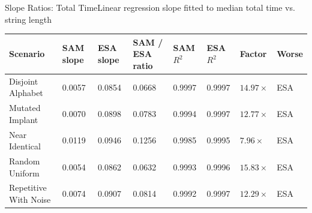 \begin{benchmarktable}{Slope Ratios: Total Time}{Linear regression slope fitted to median total time vs. string length }
\begin{tabularx}{\textwidth}{|X|X|X|X|X|X|X|X|}
\toprule
Scenario & SAM slope & ESA slope & SAM / ESA ratio & SAM $R^2$ & ESA $R^2$ & Factor & Worse \\
\midrule
Disjoint Alphabet & 0.0057 & 0.0854 & 0.0668 & 0.9997 & 0.9997 & $14.97\times$ & ESA \\
\hline
Mutated Implant & 0.0070 & 0.0898 & 0.0783 & 0.9994 & 0.9997 & $12.77\times$ & ESA \\
\hline
Near Identical & 0.0119 & 0.0946 & 0.1256 & 0.9985 & 0.9995 & $7.96\times$ & ESA \\
\hline
Random Uniform & 0.0054 & 0.0862 & 0.0632 & 0.9993 & 0.9996 & $15.83\times$ & ESA \\
\hline
Repetitive With Noise & 0.0074 & 0.0907 & 0.0814 & 0.9992 & 0.9997 & $12.29\times$ & ESA \\
\bottomrule
\end{tabularx}
\end{benchmarktable}